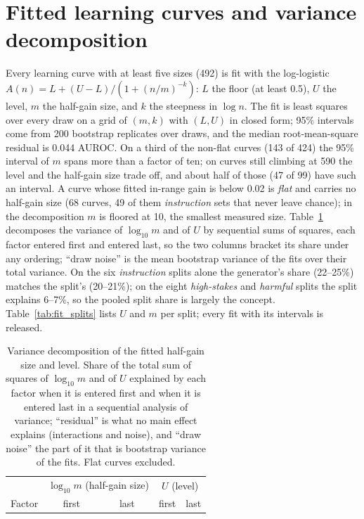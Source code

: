 \documentclass{article} %
\newcommand{\hs}{\emph{high-stakes}}
\newcommand{\harm}{\emph{harmful}}
\newcommand{\instr}{\emph{instruction}}
\begin{document}
\section{Fitted learning curves and variance decomposition}
\label{app:fits}
Every learning curve with at least five sizes (492) is fit with the log-logistic $A(n)=L+(U-L)/(1+(n/m)^{-k})$: $L$ the floor (at least 0.5), $U$ the level, $m$ the half-gain size, and $k$ the steepness in $\log n$. The fit is least squares over every draw on a grid of $(m,k)$ with $(L,U)$ in closed form; 95\% intervals come from 200 bootstrap replicates over draws, and the median root-mean-square residual is 0.044 AUROC. On a third of the non-flat curves (143 of 424) the 95\% interval of $m$ spans more than a factor of ten; on curves still climbing at 590 the level and the half-gain size trade off, and about half of those (47 of 99) have such an interval. A curve whose fitted in-range gain is below 0.02 is \emph{flat} and carries no half-gain size (68 curves, 49 of them \instr{} sets that never leave chance); in the decomposition $m$ is floored at 10, the smallest measured size. Table~\ref{tab:decomp} decomposes the variance of $\log_{10} m$ and of $U$ by sequential sums of squares, each factor entered first and entered last, so the two columns bracket its share under any ordering; ``draw noise'' is the mean bootstrap variance of the fits over their total variance. On the six \instr{} splits alone the generator's share (22--25\%) matches the split's (20--21\%); on the eight \hs{} and \harm{} splits the split explains 6--7\%, so the pooled split share is largely the concept. Table~\ref{tab:fit_splits} lists $U$ and $m$ per split; every fit with its intervals is released.

\begin{table}[H]
  \caption{Variance decomposition of the fitted half-gain size and level. Share of the total sum of squares of $\log_{10} m$ and of $U$ explained by each factor when it is entered first and when it is entered last in a sequential analysis of variance; ``residual'' is what no main effect explains (interactions and noise), and ``draw noise'' the part of it that is bootstrap variance of the fits. Flat curves excluded.}
  \label{tab:decomp}
  \centering\scriptsize
  \setlength{\tabcolsep}{5pt}
  \begin{tabular}{lcccc}
    \toprule
     & \multicolumn{2}{c}{$\log_{10} m$ (half-gain size)} & \multicolumn{2}{c}{$U$ (level)} \\
    Factor & first & last & first & last \\
    \midrule
    
  \end{tabular}
\end{table}
\end{document}
